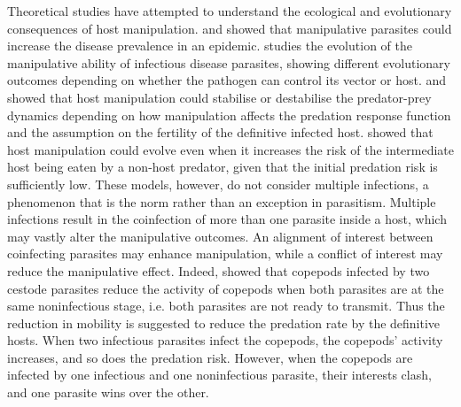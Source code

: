 \documentclass[11pt]{article}
\begin{document}
Theoretical studies have attempted to understand the ecological and evolutionary consequences of host manipulation. \cite{Roosien2013} and \cite{Hosack2008} showed that manipulative parasites could increase the disease prevalence in an epidemic. \cite{Gandon2018} studies the evolution of the manipulative ability of infectious disease parasites, showing different evolutionary outcomes depending on whether the pathogen can control its vector or host.
\cite{Hadeler1989, Fenton2006} and \cite{Rogawa2018} showed that host manipulation could stabilise or destabilise the predator-prey dynamics depending on how manipulation affects the predation response function and the assumption on the fertility of the definitive infected host. \cite{Seppl2008} showed that host manipulation could evolve even when it increases the risk of the intermediate host being eaten by a non-host predator, given that the initial predation risk is sufficiently low. 
These models, however, do not consider multiple infections, a phenomenon that is the norm rather than an exception in parasitism. Multiple infections result in the coinfection of more than one parasite inside a host, which may vastly alter the manipulative outcomes. 
An alignment of interest between coinfecting parasites may enhance manipulation, while a conflict of interest may reduce the manipulative effect. 
Indeed, \cite{Hafer:2015gl} showed that copepods infected by two cestode parasites reduce the activity of copepods when both parasites are at the same noninfectious stage, i.e. both parasites are not ready to transmit. Thus the reduction in mobility is suggested to reduce the predation rate by the definitive hosts. When two infectious parasites infect the copepods, the copepods' activity increases, and so does the predation risk. 
However, when the copepods are infected by one infectious and one noninfectious parasite, their interests clash, and one parasite wins over the other. 
\end{document}
